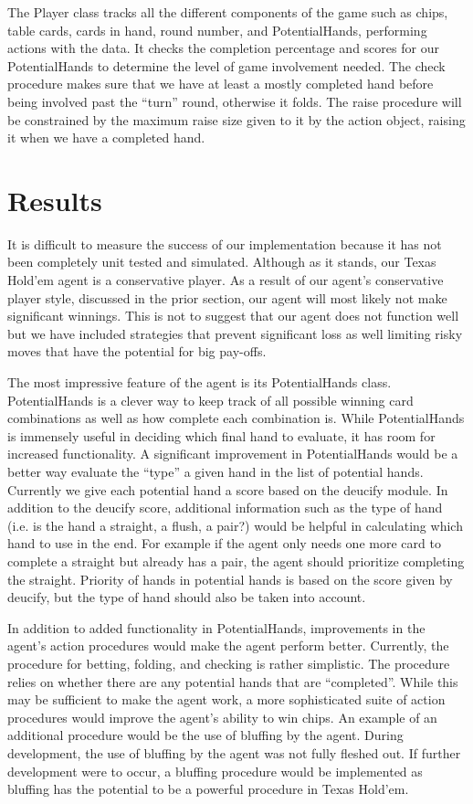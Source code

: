\documentclass[10pt, a4paper, twocolumn]{article} %
\begin{document}
	The Player class tracks all the different components of the game such as chips, table cards, cards in hand, round number, and PotentialHands, performing actions with the data. It checks the completion percentage and scores for our PotentialHands to determine the level of game involvement needed. The check procedure makes sure that we have at least a mostly completed hand before being involved past the “turn” round, otherwise it folds. The raise procedure will be constrained by the maximum raise size given to it by the action object, raising it when we have a completed hand.



\section{Results}
It is difficult to measure the success of our implementation because it has not been completely unit tested and simulated. Although as it stands, our Texas Hold’em agent is a conservative player. As a result of our agent’s conservative player style, discussed in the prior section, our agent will most likely not make significant winnings. This is not to suggest that our agent does not function well but we have included strategies that prevent significant loss as well limiting risky moves that have the potential for big pay-offs. 
	
	The most impressive feature of the agent is its PotentialHands class. PotentialHands is a clever way to keep track of all possible winning card combinations as well as how complete each combination is. While PotentialHands is immensely useful in deciding which final hand to evaluate, it has room for increased functionality. A significant improvement in PotentialHands would be a better way evaluate the “type” a given hand in the list of potential hands. Currently we give each potential hand a score based on the deucify module. In addition to the deucify score, additional information such as the type of hand (i.e. is the hand a straight, a flush, a pair?) would be helpful in calculating which hand to use in the end. For example if the agent only needs one more card to complete a straight but already has a pair, the agent should prioritize completing the straight. Priority of hands in potential hands is based on the score given by deucify, but the type of hand should also be taken into account. 
	
	In addition to added functionality in PotentialHands, improvements in the agent’s action procedures would make the agent perform better. Currently, the procedure for betting, folding, and checking is rather simplistic. The procedure relies on whether there are any potential hands that are “completed”. While this may be sufficient to make the agent work, a more sophisticated suite of action procedures would improve the agent’s ability to win chips. An example of an additional procedure would be the use of bluffing by the agent. During development, the use of bluffing by the agent was not fully fleshed out. If further development were to occur, a bluffing procedure would be implemented as bluffing has the potential to be a powerful procedure in Texas Hold’em.
	
\end{document}
